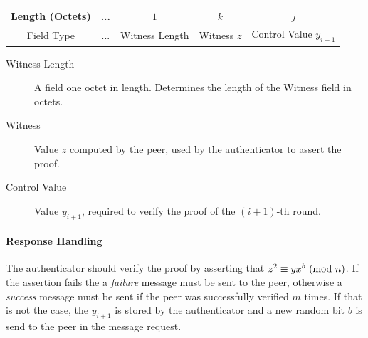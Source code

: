 \begin{center}
\begin{tabular}{|c|c|c|c|c|}
	\hline
	Length (Octets) & ... & $1$ & $k $ & $j$\\
	\hline
	Field Type & ... & Witness Length & Witness $z$ & Control Value $y_{i+1}$\\ %
	\hline
\end{tabular}
\end{center}

\begin{description}
	\item [Witness Length] A field one octet in length. Determines the length of the Witness field in octets.
	\item [Witness] Value $z$ computed by the peer, used by the authenticator to assert the proof.
	\item [Control Value] Value $y_{i+1}$, required to verify the proof of the $(i+1)$-th round.
\end{description}

\paragraph{Response Handling}
The authenticator should verify the proof by asserting that $z^2 \equiv yx^b \ (\mathrm{mod}\ n)$.
If the assertion fails the a \textit{failure} message must be sent to the peer, otherwise a \textit{success} message must be sent if the peer was successfully verified $m$ times.
If that is not the case, the $y_{i+1}$ is stored by the authenticator and a new random bit $b$ is send to the peer in the message request.

